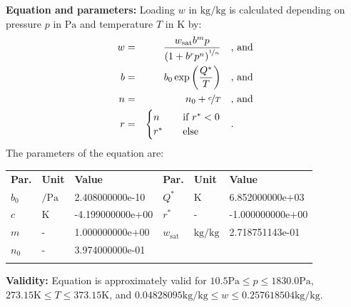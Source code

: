 \textbf{Equation and parameters:}
\newline
%
Loading $w$ in $\si{\kilogram\per\kilogram}$ is calculated depending on pressure $p$ in $\si{\pascal}$ and temperature $T$ in $\si{\kelvin}$ by:
%
\begin{equation*}
\begin{split}
w &=& \frac{w_\mathrm{sat} b^{m} p}{\left( 1 + b^{r} p^{n} \right)^{\nicefrac{1}{n}}} & \quad\text{, and} \\
b &=& b_0 \exp\left( \frac{Q^{*}}{T} \right) & \quad\text{, and} \\
n &=& n_0 + \nicefrac{c}{T} & \quad\text{, and} \\
r &=& \begin{cases} n & \quad \text{if } r^{*} < 0 \\ r^{*}  & \quad \text{else} \end{cases} & \quad\text{.}
\end{split}
\end{equation*}
%
The parameters of the equation are:
%
\begin{longtable}[l]{lll|lll}
\toprule
\addlinespace
\textbf{Par.} & \textbf{Unit} & \textbf{Value} &	\textbf{Par.} & \textbf{Unit} & \textbf{Value} \\
\addlinespace
\midrule
\endhead

\bottomrule
\endfoot
\bottomrule
\endlastfoot
\addlinespace

$b_0$ & $\si{\per\pascal}$ & 2.408000000e-10 & $Q^{*}$ & $\si{\kelvin}$ & 6.852000000e+03 \\
$c$ & $\si{\kelvin}$ & -4.199000000e+00 & $r^{*}$ & - & -1.000000000e+00 \\
$m$ & - & 1.000000000e+00 & $w_\mathrm{sat}$ & $\si{\kilogram\per\kilogram}$ & 2.718751143e-01 \\
$n_0$ & - & 3.974000000e-01 & & & \\

\addlinespace\end{longtable}

\textbf{Validity:}
\newline
Equation is approximately valid for $10.5 \si{\pascal} \leq p \leq 1830.0 \si{\pascal}$,  $273.15 \si{\kelvin} \leq T \leq 373.15 \si{\kelvin}$, and $0.04828095 \si{\kilogram\per\kilogram} \leq w \leq 0.257618504 \si{\kilogram\per\kilogram}$.
\newline


